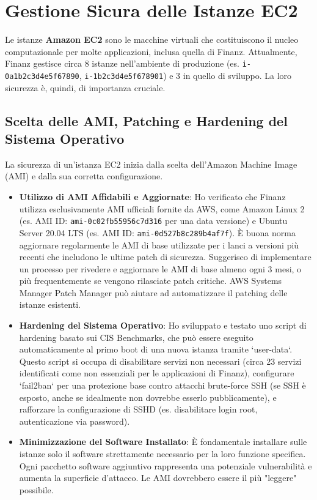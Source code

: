 \section{Gestione Sicura delle Istanze EC2}
\label{sec:ec2-security_cap2}
Le istanze \textbf{Amazon EC2} sono le macchine virtuali che costituiscono il nucleo computazionale per molte applicazioni, inclusa quella di Finanz. Attualmente, Finanz gestisce circa 8 istanze nell'ambiente di produzione (es. \texttt{i-0a1b2c3d4e5f67890}, \texttt{i-1b2c3d4e5f678901}) e 3 in quello di sviluppo. La loro sicurezza è, quindi, di importanza cruciale.

\subsection{Scelta delle AMI, Patching e Hardening del Sistema Operativo}
\label{subsec:ami-hardening_cap2}
La sicurezza di un'istanza EC2 inizia dalla scelta dell'Amazon Machine Image (AMI) e dalla sua corretta configurazione.
\begin{itemize}
    \item \textbf{Utilizzo di AMI Affidabili e Aggiornate}: Ho verificato che Finanz utilizza esclusivamente AMI ufficiali fornite da AWS, come Amazon Linux 2 (es. AMI ID: \texttt{ami-0c02fb55956c7d316} per una data versione) e Ubuntu Server 20.04 LTS (es. AMI ID: \texttt{ami-0d527b8c289b4af7f}). È buona norma aggiornare regolarmente le AMI di base utilizzate per i lanci a versioni più recenti che includono le ultime patch di sicurezza. Suggerisco di implementare un processo per rivedere e aggiornare le AMI di base almeno ogni 3 mesi, o più frequentemente se vengono rilasciate patch critiche. AWS Systems Manager Patch Manager può aiutare ad automatizzare il patching delle istanze esistenti.
    \item \textbf{Hardening del Sistema Operativo}: Ho sviluppato e testato uno script di hardening basato sui CIS Benchmarks, che può essere eseguito automaticamente al primo boot di una nuova istanza tramite `user-data`. Questo script si occupa di disabilitare servizi non necessari (circa 23 servizi identificati come non essenziali per le applicazioni di Finanz), configurare `fail2ban` per una protezione base contro attacchi brute-force SSH (se SSH è esposto, anche se idealmente non dovrebbe esserlo pubblicamente), e rafforzare la configurazione di SSHD (es. disabilitare login root, autenticazione via password).
    \item \textbf{Minimizzazione del Software Installato}: È fondamentale installare sulle istanze solo il software strettamente necessario per la loro funzione specifica. Ogni pacchetto software aggiuntivo rappresenta una potenziale vulnerabilità e aumenta la superficie d'attacco. Le AMI dovrebbero essere il più "leggere" possibile.
\end{itemize}
